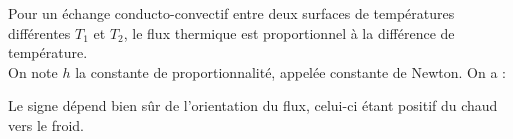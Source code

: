 \documentclass[a4paper]{article}
\begin{document}
\pagestyle{fancy}
\fancyhf{}
\setlength{\headheight}{15pt}

\begin{center}
	\large{}
\end{center}


Pour un échange conducto-convectif entre deux surfaces de températures différentes \(T_1\) et \(T_2\), le flux thermique est proportionnel à la différence de température.\\
On note \(h\) la constante de proportionnalité, appelée constante de Newton. On a :\begin{center}\end{center}
Le signe dépend bien sûr de l'orientation du flux, celui-ci étant positif du chaud vers le froid.
\end{document}
